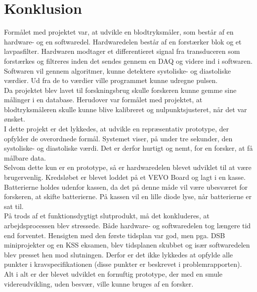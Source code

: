 \chapter{Konklusion}
Formålet med projektet var, at udvikle en blodtryksmåler, som består af en hardware- og en softwaredel. Hardwaredelen består af en forstærker blok og et lavpasfilter. Hardwaren modtager et differentieret signal fra transduceren som forstærkes og filtreres inden det sendes gennem en DAQ og videre ind i softwaren. Softwaren vil gennem algoritmer, kunne detektere systoliske- og diastoliske værdier. Ud fra de to værdier ville programmet kunne udregne pulsen. \\
Da projektet blev lavet til forskningsbrug skulle forskeren kunne gemme sine målinger i en database. Herudover var formålet med projektet, at blodtryksmåleren skulle kunne blive kalibreret og nulpunktsjusteret, når det var ønsket. \\
I dette projekt er det lykkedes, at udvikle en repræsentativ prototype, der opfylder de overordnede formål. Systemet viser, på under tre sekunder, den systoliske- og diastoliske værdi. Det er derfor hurtigt og nemt, for en forsker, at få målbare data.\\
Selvom dette kun er en prototype, så er hardwaredelen blevet udviklet til at være brugervenlig. Kredsløbet er blevet loddet på et VEVO Board og lagt i en kasse. Batterierne holdes udenfor kassen, da det på denne måde vil være ubesværet for forskeren, at skifte batterierne. På kassen vil en lille diode lyse, når batterierne er sat til. \\
På trods af et funktionsdygtigt slutprodukt, må det konkluderes, at arbejdsprocessen blev stressede. Både hardware- og softwaredelen tog længere tid end forventet. Hensigten med den første tidsplan var god, men pga. DSB miniprojekter og en KSS eksamen, blev tidsplanen skubbet og især softwaredelen blev presset hen mod slutningen. Derfor er det ikke lykkedes at opfylde alle punkter i kravspecifikationen (disse punkter er beskrevet i problemrapporten). \\
Alt i alt er der blevet udviklet en fornuftig prototype, der med en smule videreudvikling, uden besvær, ville kunne bruges af en forsker. \\

